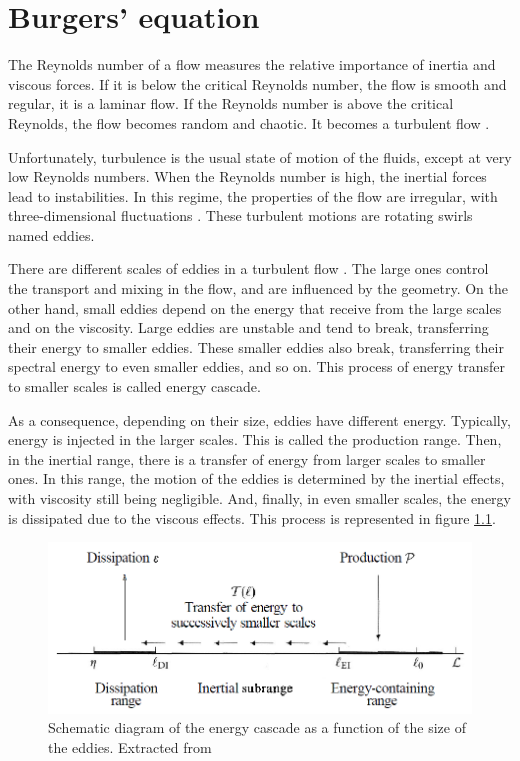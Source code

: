 \chapter{Burgers' equation}
The Reynolds number of a flow measures the relative importance of inertia and viscous forces. If it is below the critical Reynolds number, the flow is smooth and regular, it is a laminar flow. If the Reynolds number is above the critical Reynolds, the flow becomes random and chaotic. It becomes a turbulent flow \cite{Versteeg2007}.

Unfortunately, turbulence is the usual state of motion of the fluids, except at very low Reynolds numbers. When the Reynolds number is high, the inertial forces lead to instabilities. In this regime, the properties of the flow are irregular, with three-dimensional fluctuations \cite{CTTCb}. These turbulent motions are rotating swirls named eddies.

There are different scales of eddies in a turbulent flow \cite{Pope2000}. The large ones control the transport and mixing in the flow, and are influenced by the geometry. On the other hand, small eddies depend on the energy that receive from the large scales and on the viscosity. Large eddies are unstable and tend to break, transferring their energy to smaller eddies. These smaller eddies also break, transferring their spectral energy to even smaller eddies, and so on. This process of energy transfer to smaller scales is called energy cascade.

As a consequence, depending on their size, eddies have different energy. Typically, energy is injected in the larger scales. This is called the production range. Then, in the inertial range, there is a transfer of energy from larger scales to smaller ones. In this range, the motion of the eddies is determined by the inertial effects, with viscosity still being negligible. And, finally, in even smaller scales, the energy is dissipated due to the viscous effects. This process is represented in figure \ref{energylength}.

\begin{figure}
	\centering
	\includegraphics[scale=0.6]{Burgers/energylength}
	\caption[Schematic diagram of the energy cascade as a function of the size of the eddies]{Schematic diagram of the energy cascade as a function of the size of the eddies. Extracted from \cite{Pope2000}}
	\label{energylength}
\end{figure}

